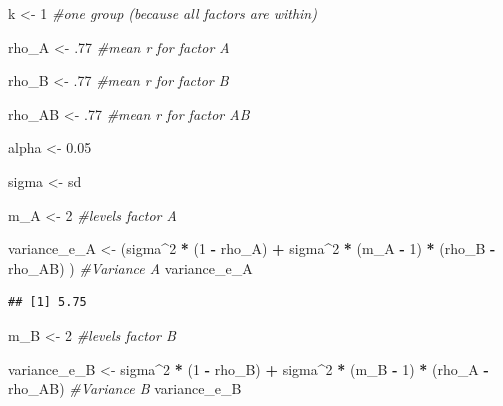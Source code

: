 \documentclass[
]{book}
\newenvironment{Shaded}{\begin{snugshade}}{\end{snugshade}}
\newcommand{\CommentTok}[1]{\textcolor[rgb]{0.56,0.35,0.01}{\textit{#1}}}
\newcommand{\DecValTok}[1]{\textcolor[rgb]{0.00,0.00,0.81}{#1}}
\newcommand{\FloatTok}[1]{\textcolor[rgb]{0.00,0.00,0.81}{#1}}
\newcommand{\NormalTok}[1]{#1}
\newcommand{\OperatorTok}[1]{\textcolor[rgb]{0.81,0.36,0.00}{\textbf{#1}}}
\newcommand{\StringTok}[1]{\textcolor[rgb]{0.31,0.60,0.02}{#1}}
\begin{document}
\begin{Shaded}
\begin{Highlighting}[]
\NormalTok{k <-}\StringTok{ }\DecValTok{1} \CommentTok{#one group (because all factors are within)}

\NormalTok{rho_A <-}\StringTok{ }\FloatTok{.77} \CommentTok{#mean r for factor A}

\NormalTok{rho_B <-}\StringTok{ }\FloatTok{.77} \CommentTok{#mean r for factor B}

\NormalTok{rho_AB <-}\StringTok{ }\FloatTok{.77} \CommentTok{#mean r for factor AB}

\NormalTok{alpha <-}\StringTok{ }\FloatTok{0.05}

\NormalTok{sigma <-}\StringTok{ }\NormalTok{sd}

\NormalTok{m_A <-}\StringTok{ }\DecValTok{2} \CommentTok{#levels factor A}

\NormalTok{variance_e_A <-}\StringTok{ }\NormalTok{(sigma}\OperatorTok{^}\DecValTok{2} \OperatorTok{*}\StringTok{ }\NormalTok{(}\DecValTok{1} \OperatorTok{-}\StringTok{ }\NormalTok{rho_A) }\OperatorTok{+}\StringTok{ }
\StringTok{  }\NormalTok{sigma}\OperatorTok{^}\DecValTok{2} \OperatorTok{*}\StringTok{ }\NormalTok{(m_A }\OperatorTok{-}\StringTok{ }\DecValTok{1}\NormalTok{) }\OperatorTok{*}\StringTok{ }\NormalTok{(rho_B }\OperatorTok{-}\StringTok{ }\NormalTok{rho_AB) )}
\CommentTok{#Variance A}
\NormalTok{variance_e_A}
\end{Highlighting}
\end{Shaded}

\begin{verbatim}
## [1] 5.75
\end{verbatim}

\begin{Shaded}
\begin{Highlighting}[]
\NormalTok{m_B <-}\StringTok{ }\DecValTok{2} \CommentTok{#levels factor B}

\NormalTok{variance_e_B <-}\StringTok{ }\NormalTok{sigma}\OperatorTok{^}\DecValTok{2} \OperatorTok{*}\StringTok{ }\NormalTok{(}\DecValTok{1} \OperatorTok{-}\StringTok{ }\NormalTok{rho_B) }\OperatorTok{+}\StringTok{ }
\StringTok{  }\NormalTok{sigma}\OperatorTok{^}\DecValTok{2} \OperatorTok{*}\StringTok{ }\NormalTok{(m_B }\OperatorTok{-}\StringTok{ }\DecValTok{1}\NormalTok{) }\OperatorTok{*}\StringTok{ }\NormalTok{(rho_A }\OperatorTok{-}\StringTok{ }\NormalTok{rho_AB)}
\CommentTok{#Variance B}
\NormalTok{variance_e_B}
\end{Highlighting}
\end{Shaded}
\end{document}
